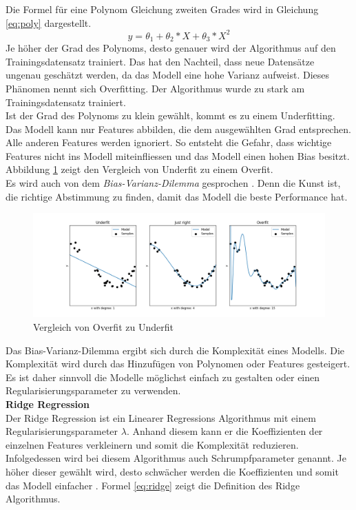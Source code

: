 Die Formel für eine Polynom Gleichung zweiten Grades wird in Gleichung \eqref{eq:poly} dargestellt.
%
\begin{equation}
\label{eq:poly}
y = \theta_1 + \theta_2 * X + \theta_3 * X^2
\end{equation}
%
\newline
Je höher der Grad des Polynoms, desto genauer wird der Algorithmus auf den Trainingsdatensatz trainiert. Das hat den Nachteil, dass neue Datensätze ungenau geschätzt werden, da das Modell eine hohe Varianz aufweist. Dieses Phänomen nennt sich Overfitting. Der Algorithmus wurde zu stark am Trainingsdatensatz trainiert.\\
Ist der Grad des Polynoms zu klein gewählt, kommt es zu einem Underfitting. Das Modell kann nur Features abbilden, die dem ausgewählten Grad entsprechen. Alle anderen Features werden ignoriert. So entsteht die Gefahr, dass wichtige Features nicht ins Modell miteinfliessen und das Modell einen hohen Bias besitzt. Abbildung \ref{fig:under_overfit} zeigt den Vergleich von Underfit zu einem Overfit.\\
Es wird auch von dem \textit{Bias-Varianz-Dilemma} gesprochen \cite{bias_variance, bias_variance_2}. Denn die Kunst ist, die richtige Abstimmung zu finden, damit das Modell die beste Performance hat.
\begin{figure}[ht]
\centering
\includegraphics[width=\textwidth]{images/overfit_underfit.png}
\caption[Vergleich von Overfit zu Underfit]{Vergleich von Overfit zu Underfit}%
\label{fig:under_overfit}
\end{figure}
%
Das Bias-Varianz-Dilemma ergibt sich durch die Komplexität eines Modells. Die Komplexität wird durch das Hinzufügen von Polynomen oder Features gesteigert.
Es ist daher sinnvoll die Modelle möglichst einfach zu gestalten oder einen Regularisierungsparameter zu verwenden.\\[2ex]
%
\textbf{Ridge Regression}\\
Der Ridge Regression ist ein Linearer Regressions Algorithmus mit einem Regularisierungsparameter $\lambda$. Anhand diesem kann er die Koeffizienten der einzelnen Features verkleinern und somit die Komplexität reduzieren. Infolgedessen wird bei diesem Algorithmus auch Schrumpfparameter genannt. Je höher dieser gewählt wird, desto schwächer werden die Koeffizienten und somit das Modell einfacher \cite{ridge, ridge_2}. Formel \eqref{eq:ridge} zeigt die Definition des Ridge Algorithmus.
